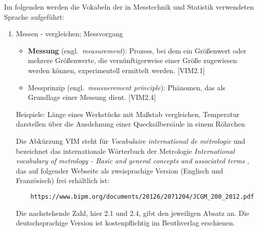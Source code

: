 \begin{raggedright}
Im folgenden werden die Vokabeln der in Messtechnik und Statistik verwendeten Sprache aufgeführt:
\begin{enumerate}
\item Messen - vergleichen; Messvorgang
	\begin{itemize}
	\item \textbf{Messung} (engl.\ \textsl{measurement}): Prozess, bei dem ein Größenwert oder mehrere Grö\-ßen\-werte, die
	vernünftigerweise einer Größe zugewiesen werden können, experimentell ermittelt werden. [VIM2.1]
	\item Messprinzip (engl.\ \textsl{measuerement principle}): Phänomen, das als Grundlage einer
	Messung dient. [VIM2.4]
	\end{itemize}
	Beispiele: Länge eines Werkstücks mit Maßstab vergleichen, Temperatur darstellen über
	die Ausdehnung einer Quecksilbersäule in einem Röhrchen

	Die Abkürzung VIM steht für \textsl{Vocabulaire international de m{\'e}trologie}
	und bezeichnet das internationale Wörterbuch der Metrologie
	\textsl{International vocabulary of metrology -
	Basic and general concepts and associated terms} \cite{VIM08}, das auf folgender Webseite als zweisprachige
	Version (Englisch und Französisch) frei erhältlich ist:
	\begin{verbatim}
	https://www.bipm.org/documents/20126/2071204/JCGM_200_2012.pdf
	\end{verbatim}
	Die nachstehende Zahl, hier 2.1 und 2.4, gibt den jeweiligen Absatz an. Die deutschsprachige
	Version ist kostenpflichtig im Beuthverlag erschienen.


\end{enumerate}
\end{raggedright}
